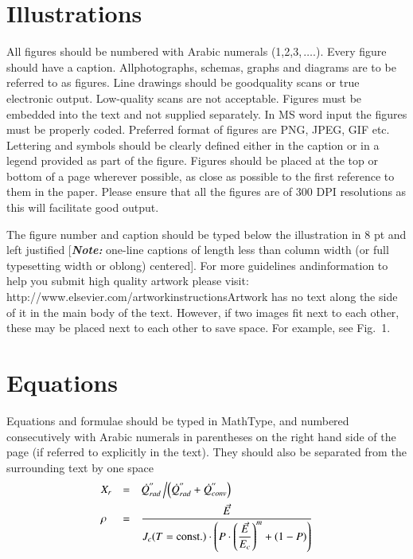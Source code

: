 \documentclass[5p,times,procedia]{elsarticle}
\begin{document}
\section{Illustrations}
All figures should be numbered with Arabic numerals (1,2,3,$\,\ldots.$). Every figure should have a caption. All\break photographs, schemas, graphs and diagrams are to be referred to as figures. Line drawings should be good\break quality scans or true electronic output. Low-quality scans are not acceptable. Figures must be embedded into the text and not supplied separately. In MS word input the figures must be properly coded. Preferred format of figures are PNG, JPEG, GIF etc. Lettering and symbols should be clearly defined either in the caption or in a legend provided as part of the figure. Figures should be placed at the top or bottom of a page wherever possible, as close as possible to the first reference to them in the paper. Please ensure that all the figures are of 300 DPI resolutions as this will facilitate good output.

The figure number and caption should be typed below the illustration in 8 pt and left justified [{\bfseries\itshape Note:} one-line captions of length less than column width (or full typesetting width or oblong) centered]. For more guidelines and\break information to help you submit high quality artwork please visit: http://www.elsevier.com/artworkinstructions\break Artwork has no text along the side of it in the main body of the text. However, if two images fit next to each other, these may be placed next to each other to save space. For example, see Fig.~1.


\section{Equations}
Equations and formulae should be typed in MathType, and numbered consecutively with Arabic numerals in parentheses on the right hand side of the page (if referred to explicitly in the text). They should also be separated from the surrounding text by one space
\begin{equation}
\begin{array}{lcl}
\displaystyle X_r &=& \displaystyle\dot{Q}^{''}_{rad}\left/\left(\dot{Q}^{''}_{rad} + \dot{Q}^{''}_{conv}\right)\right.\\[6pt]
\displaystyle \rho &=& \displaystyle\frac{\vec{E}}{J_c(T={\rm const.})\cdot\left(P\cdot\left(\displaystyle\frac{\vec{E}}{E_c}\right)^m+(1-P)\right)}
\end{array}
\end{equation}
\end{document}

